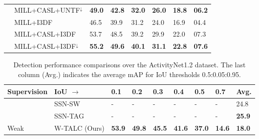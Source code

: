 \documentclass[runningheads]{llncs}
\begin{document}
\begin{table}[h!]
\begin{tabular}{C{1.9cm} || p{2.8cm} || C{1cm} C{1cm}  C{1cm}  C{1cm}  C{1cm} C{1cm}}
		\hline
		{} & {MILL+CASL+UNTF$^\downarrow$} & {\textbf{49.0}} & {\textbf{42.8}} & {\textbf{32.0}} & {\textbf{26.0}} & {\textbf{18.8}} & {\textbf{06.2}} \\
		& {MILL+I3DF} & {46.5} & {39.9} & {31.2} & {24.0} & {16.9} & {04.4}\\		
		& {MILL+CASL+I3DF} & {53.7} & {48.5} & {39.2} & {29.9} & {22.0} & {07.3} \\
		& {MILL+CASL+I3DF$^\downarrow$} & {\textbf{55.2}} & {\textbf{49.6}} & {\textbf{40.1}} & {\textbf{31.1}} & {\textbf{22.8}} & {\textbf{07.6}} \\
		\hline
		\hline
	\end{tabular}
	\label{thumos14_localization}
\end{table}
\begin{table}[h!]
	\fontsize{8.5}{9.5}\selectfont
	\centering	
	\caption{Detection performance comparisons over the ActivityNet1.2 dataset. The last column (Avg.) indicates the average mAP for IoU thresholds 0.5:0.05:0.95. }
	\begin{tabular}{C{1.6cm} || p{2.4cm} || C{1cm} C{1cm}  C{1cm}  C{1cm}  C{1cm} C{1cm} C{1cm}}
		\hline
		{Supervision} & {IoU $\rightarrow$} & {0.1} & {0.2} & {0.3} & {0.4} & {0.5} & {0.7} & {Avg.}\\
		\hline \hline	 
		{} & {SSN-SW \cite{zhao2017temporal}} & {-} & {-} & {-} & {-} & {-} & {-} & {24.8}\\
		& {SSN-TAG \cite{zhao2017temporal}} & {-} & {-} & {-} & {-} & {-} & {-} & {\textbf{25.9}}\\	
		\hline
		\hline
		{Weak} & {W-TALC (Ours)} & {\textbf{53.9}} & {\textbf{49.8}} & {\textbf{45.5}} & {\textbf{41.6}} & {\textbf{37.0}} & {\textbf{14.6}} & {\textbf{18.0}}\\
		\hline
		\hline
	\end{tabular}
	\label{activitynet_localization}
\end{table}
\end{document}
